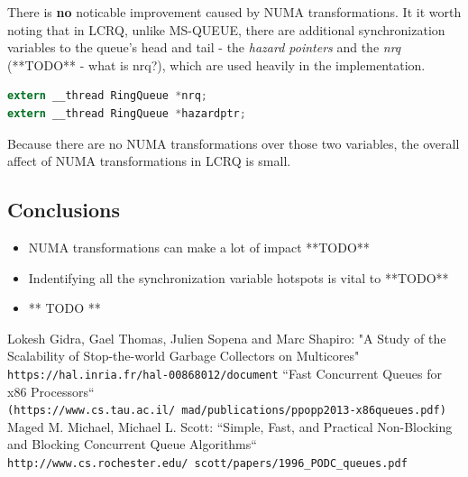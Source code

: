 \documentclass{article}
\begin{document}
 There is \textbf{no} noticable improvement caused by NUMA transformations. It it worth noting that in LCRQ, unlike MS-QUEUE, there are additional synchronization variables to the queue's head and tail - the \textit{hazard pointers} and the \textit{nrq} (**TODO** - what is nrq?), which are used heavily in the implementation.

 \begin{lstlisting}[language=C]
extern __thread RingQueue *nrq;
extern __thread RingQueue *hazardptr;
 \end{lstlisting}

 Because there are no NUMA transformations over those two variables, the overall affect of NUMA transformations in LCRQ is small.

 \subsection{Conclusions}

 \begin{itemize}
   \item NUMA transformations can make a lot of impact **TODO**
   \item Indentifying all the synchronization variable hotspots is vital to **TODO**
   \item ** TODO **
 \end{itemize}

  \medskip
  \newpage

  \begin{thebibliography}{9}
      Lokesh Gidra, Gael Thomas, Julien Sopena and Marc Shapiro: "A Study of the Scalability of Stop-the-world Garbage Collectors on Multicores"
      \\\texttt{https://hal.inria.fr/hal-00868012/document}
      ``Fast Concurrent Queues for x86 Processors``
      \\\texttt{(https://www.cs.tau.ac.il/~mad/publications/ppopp2013-x86queues.pdf)}
	    Maged M. Michael, Michael L. Scott: ``Simple, Fast, and Practical Non-Blocking and Blocking Concurrent Queue Algorithms``
      \\\texttt{http://www.cs.rochester.edu/~scott/papers/1996\_PODC\_queues.pdf}
  \end{thebibliography}
\end{document}
